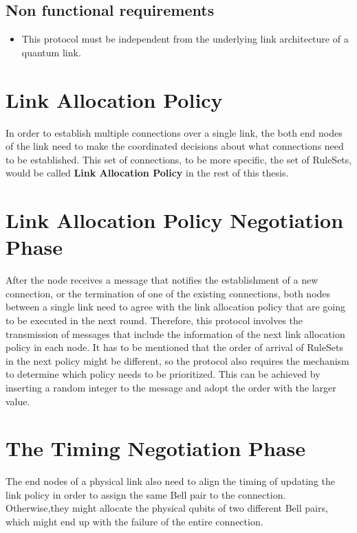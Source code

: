 \subsection{Non functional requirements}

\begin{itemize}
  \item This protocol must be independent from the underlying link architecture of a quantum link.
\end{itemize}

\section{Link Allocation Policy}

In order to establish multiple connections over a single link, the both end nodes of the link need to make the coordinated decisions about what connections need to be established.
This set of connections, to be more specific, the set of RuleSets, would be called \textbf{Link Allocation Policy} in the rest of this thesis.

\section{Link Allocation Policy Negotiation Phase}

After the node receives a message that notifies the establishment of a new connection, or the termination of one of the existing connections, both nodes between a single link need to agree with the link allocation policy that are going to be executed in the next round.
Therefore, this protocol involves the transmission of messages that include the information of the next link allocation policy in each node.  It has to be mentioned that the order of arrival of RuleSets in the next policy might be different, so the protocol also requires the mechanism to determine which policy needs to be prioritized.
This can be achieved by inserting a random integer to the message and adopt the order with the larger value.

\section{The Timing Negotiation Phase}

The end nodes of a physical link also need to align the timing of updating the link policy in order to assign the same Bell pair to the connection.
Otherwise,they might allocate the physical qubits of two different Bell pairs, which might end up with the failure of the entire connection.

